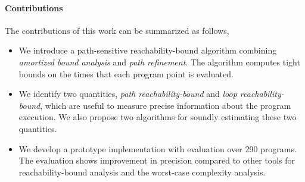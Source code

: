 \paragraph{Contributions}
The contributions of this work can be summarized as follows,
\begin{itemize}
  \item We introduce a path-sensitive reachability-bound algorithm 
  combining \emph{amortized bound analysis}  and \emph{path refinement}. The algorithm computes tight bounds on the times that each program point is evaluated.

  \item We identify two quantities,  \emph{path reachability-bound} and \emph{loop reachability-bound}, which are useful to measure precise information about the program execution.  We also propose two algorithms for soundly estimating these two quantities.
  \item We develop a prototype implementation with evaluation over 290 programs.
  The evaluation shows improvement in precision compared to other tools for reachability-bound analysis and the worst-case complexity analysis.

\end{itemize}